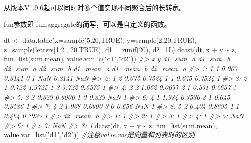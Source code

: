 \documentclass[
]{book}
\newenvironment{Shaded}{\begin{snugshade}}{\end{snugshade}}
\newcommand{\AttributeTok}[1]{\textcolor[rgb]{0.77,0.63,0.00}{#1}}
\newcommand{\CommentTok}[1]{\textcolor[rgb]{0.56,0.35,0.01}{\textit{#1}}}
\newcommand{\ConstantTok}[1]{\textcolor[rgb]{0.00,0.00,0.00}{#1}}
\newcommand{\DecValTok}[1]{\textcolor[rgb]{0.00,0.00,0.81}{#1}}
\newcommand{\FunctionTok}[1]{\textcolor[rgb]{0.00,0.00,0.00}{#1}}
\newcommand{\NormalTok}[1]{#1}
\newcommand{\OtherTok}[1]{\textcolor[rgb]{0.56,0.35,0.01}{#1}}
\newcommand{\SpecialCharTok}[1]{\textcolor[rgb]{0.00,0.00,0.00}{#1}}
\newcommand{\StringTok}[1]{\textcolor[rgb]{0.31,0.60,0.02}{#1}}
\begin{document}
从版本V1.9.6起可以同时对多个值实现不同聚合后的长转宽。

fun参数即 fun.aggregate的简写，可以是自定义的函数。

\begin{Shaded}
\begin{Highlighting}[]
\NormalTok{dt }\OtherTok{\textless{}{-}}  \FunctionTok{data.table}\NormalTok{(}\AttributeTok{x=}\FunctionTok{sample}\NormalTok{(}\DecValTok{5}\NormalTok{,}\DecValTok{20}\NormalTok{,}\ConstantTok{TRUE}\NormalTok{), }\AttributeTok{y=}\FunctionTok{sample}\NormalTok{(}\DecValTok{2}\NormalTok{,}\DecValTok{20}\NormalTok{,}\ConstantTok{TRUE}\NormalTok{),}
                \AttributeTok{z=}\FunctionTok{sample}\NormalTok{(letters[}\DecValTok{1}\SpecialCharTok{:}\DecValTok{2}\NormalTok{], }\DecValTok{20}\NormalTok{,}\ConstantTok{TRUE}\NormalTok{), }\AttributeTok{d1 =} \FunctionTok{runif}\NormalTok{(}\DecValTok{20}\NormalTok{), }\AttributeTok{d2=}\NormalTok{1L)}
\FunctionTok{dcast}\NormalTok{(dt, x }\SpecialCharTok{+}\NormalTok{ y }\SpecialCharTok{\textasciitilde{}}\NormalTok{ z, }\AttributeTok{fun=}\FunctionTok{list}\NormalTok{(sum,mean), }\AttributeTok{value.var=}\FunctionTok{c}\NormalTok{(}\StringTok{"d1"}\NormalTok{,}\StringTok{"d2"}\NormalTok{))}
\CommentTok{\#\textgreater{}    x y d1\_sum\_a d1\_sum\_b d2\_sum\_a d2\_sum\_b d1\_mean\_a d1\_mean\_b d2\_mean\_a}
\CommentTok{\#\textgreater{} 1: 1 1    0.000   0.3141        0        1       NaN    0.3141       NaN}
\CommentTok{\#\textgreater{} 2: 1 2    0.675   0.7524        1        1     0.675    0.7524         1}
\CommentTok{\#\textgreater{} 3: 2 1    0.722   1.9725        1        3     0.722    0.6575         1}
\CommentTok{\#\textgreater{} 4: 2 2    1.062   0.0657        2        1     0.531    0.0657         1}
\CommentTok{\#\textgreater{} 5: 3 2    0.329   0.0000        1        0     0.329       NaN         1}
\CommentTok{\#\textgreater{} 6: 4 1    1.934   0.3536        3        1     0.645    0.3536         1}
\CommentTok{\#\textgreater{} 7: 4 2    1.968   0.0000        3        0     0.656       NaN         1}
\CommentTok{\#\textgreater{} 8: 5 2    0.404   0.8995        1        1     0.404    0.8995         1}
\CommentTok{\#\textgreater{}    d2\_mean\_b}
\CommentTok{\#\textgreater{} 1:         1}
\CommentTok{\#\textgreater{} 2:         1}
\CommentTok{\#\textgreater{} 3:         1}
\CommentTok{\#\textgreater{} 4:         1}
\CommentTok{\#\textgreater{} 5:       NaN}
\CommentTok{\#\textgreater{} 6:         1}
\CommentTok{\#\textgreater{} 7:       NaN}
\CommentTok{\#\textgreater{} 8:         1}
\FunctionTok{dcast}\NormalTok{(dt, x }\SpecialCharTok{+}\NormalTok{ y }\SpecialCharTok{\textasciitilde{}}\NormalTok{ z, }\AttributeTok{fun=}\FunctionTok{list}\NormalTok{(sum,mean), }\AttributeTok{value.var=}\FunctionTok{list}\NormalTok{(}\StringTok{"d1"}\NormalTok{,}\StringTok{"d2"}\NormalTok{)) }\CommentTok{\#注意value.var是向量和列表时的区别}

\end{Highlighting}
\end{Shaded}
\end{document}

